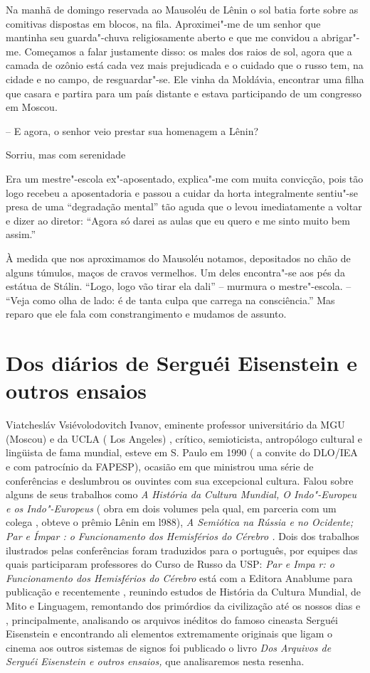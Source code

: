 Na manhã de domingo reservada ao Mausoléu de Lênin o sol batia forte
sobre as comitivas dispostas em blocos, na fila. Aproximei"-me de um
senhor que mantinha seu guarda"-chuva religiosamente aberto e que me
convidou a abrigar"-me. Começamos a falar justamente disso: os males dos
raios de sol, agora que a camada de ozônio está cada vez mais
prejudicada e o cuidado que o russo tem, na cidade e no campo, de
resguardar"-se. Ele vinha da Moldávia, encontrar uma filha que casara e
partira para um país distante e estava participando de um congresso em
Moscou.

-- E agora, o senhor veio prestar sua homenagem a Lênin?

Sorriu, mas com serenidade

Era um mestre"-escola ex"-aposentado, explica"-me com muita convicção, pois
tão logo recebeu a aposentadoria e passou a cuidar da horta
integralmente sentiu"-se presa de uma ``degradação mental'' tão aguda que
o levou imediatamente a voltar e dizer ao diretor: ``Agora só darei as
aulas que eu quero e me sinto muito bem assim.''

À medida que nos aproximamos do Mausoléu notamos, depositados no chão de
alguns túmulos, maços de cravos vermelhos. Um deles encontra"-se aos pés
da estátua de Stálin. ``Logo, logo vão tirar ela dali'' -- murmura o
mestre"-escola. -- ``Veja como olha de lado: é de tanta culpa que carrega
na consciência.'' Mas reparo que ele fala com constrangimento e mudamos
de assunto.

\chapter{Dos diários de Serguéi Eisenstein e outros ensaios}

Viatchesláv Vsiévolodovitch Ivanov, eminente professor universitário da
MGU (Moscou) e da UCLA ( Los Angeles) , crítico, semioticista,
antropólogo cultural e lingüista de fama mundial, esteve em S. Paulo em
1990 ( a convite do DLO/IEA e com patrocínio da FAPESP), ocasião em que
ministrou uma série de conferências e deslumbrou os ouvintes com sua
excepcional cultura. Falou sobre alguns de seus trabalhos como \emph{A}
\emph{História da Cultura Mundial, O Indo"-Europeu e os Indo"-Europeus} (
obra em dois volumes pela qual, em parceria com um colega , obteve o
prêmio Lênin em l988), \emph{A Semiótica na Rússia e no Ocidente; Par e
Ímpar : o Funcionamento dos Hemisférios do Cérebro .} Dois dos trabalhos
ilustrados pelas conferências foram traduzidos para o português, por
equipes das quais participaram professores do Curso de Russo da USP:
\emph{Par e Impa r: o Funcionamento dos Hemisférios do Cérebro} está com
a Editora Anablume para publicação e recentemente , reunindo estudos de
História da Cultura Mundial, de Mito e Linguagem, remontando dos
primórdios da civilização até os nossos dias e , principalmente,
analisando os arquivos inéditos do famoso cineasta Serguéi Eisenstein e
encontrando ali elementos extremamente originais que ligam o cinema aos
outros sistemas de signos foi publicado o livro \emph{Dos Arquivos de
Serguéi Eisenstein e outros ensaios,} que analisaremos nesta resenha.

